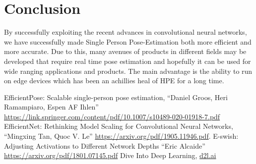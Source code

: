 \documentclass{fisatprojectfinal}
\begin{document}
\chapter{Conclusion}

By successfully exploiting the recent advances in convolutional neural networks, we have successfully made Single Person Pose-Estimation both more efficient and more accurate.
Due to this, many avenues of products in different fields may be developed that require real time pose estimation and hopefully it can be
used for wide ranging applications and products. The main advantage is the ability to run on edge devices which has been an achillies heal of
HPE for a long time.

\begin{thebibliography}{1}
 EfficientPose: Scalable single-person pose estimation, ``Daniel Groos, Heri Ramampiaro, Espen AF Ihlen'' \url{https://link.springer.com/content/pdf/10.1007/s10489-020-01918-7.pdf}
 EfficientNet: Rethinking Model Scaling for Convolutional Neural Networks, ``Mingxing Tan, Quoc V. Le'' \url{https://arxiv.org/pdf/1905.11946.pdf}.
 E-swish: Adjusting Activations to Different Network Depths ``Eric Alcaide'' \url{https://arxiv.org/pdf/1801.07145.pdf}
 Dive Into Deep Learning, \url{d2l.ai}
\end{thebibliography}
\end{document}
